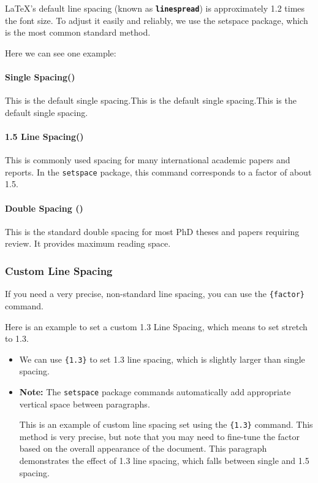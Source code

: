 \documentclass[12pt, letterpaper]{article}
\begin{document}
\begin{spacing}{1.3}
LaTeX's default line spacing (known as \textbf{\texttt{linespread}}) is approximately 1.2 times the font size. To adjust it easily and reliably, we use the setspace package, which is the most common standard method.

Here we can see one example:
\begin{spacing}{1.0} %
\paragraph{Single Spacing(\texttt{\string\singlespacing})}

This is the default single spacing.This is the default single spacing.This is the default single spacing.
\end{spacing}
\begin{spacing}{1.5}
\paragraph{1.5 Line Spacing(\texttt{\string\onehalfspacing})}

This is commonly used spacing for many international academic papers and reports. In the \texttt{setspace} package, this command corresponds to a factor of about 1.5.
\end{spacing}
\begin{spacing}{2.0}
\paragraph{Double Spacing (\texttt{\string\doublespacing})}
This is the standard double spacing for most PhD theses and papers requiring review. It provides maximum reading space.
\end{spacing}

\subsubsection{Custom Line Spacing}

If you need a very precise, non-standard line spacing, you can use the \texttt{\string\setstretch\{factor\}} command.

Here is an example to set a custom 1.3 Line Spacing, which means to set stretch to 1.3.
\begin{itemize}
    \item We can use \texttt{\string\setstretch\{1.3\}} to set 1.3 line spacing, which is slightly larger than single spacing.
    \item \textbf{Note:} The \texttt{setspace} package commands automatically add appropriate vertical space between paragraphs.
\begin{spacing}{1.3}
This is an example of custom line spacing set using the \texttt{\string\setstretch\{1.3\}} command. This method is very precise, but note that you may need to fine-tune the factor based on the overall appearance of the document. This paragraph demonstrates the effect of 1.3 line spacing, which falls between single and 1.5 spacing.
\end{spacing}
\end{itemize}


\end{spacing}
\end{document}
